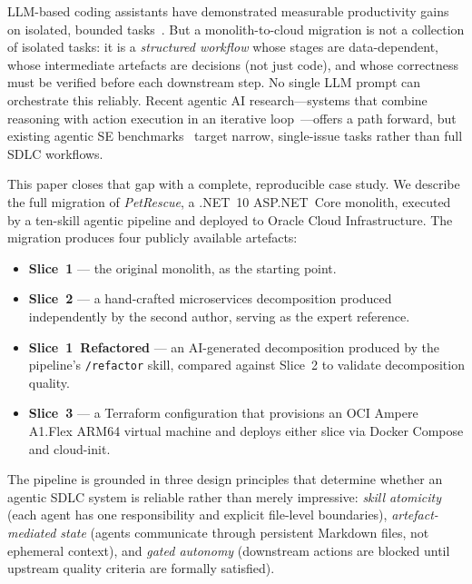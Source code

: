 \documentclass[10pt,journal,compsoc]{IEEEtran}
\begin{document}
LLM-based coding assistants have demonstrated measurable productivity
gains on isolated, bounded tasks~\cite{peng2023copilot,
vaithilingam2022expectation}.  But a monolith-to-cloud migration is
not a collection of isolated tasks: it is a \emph{structured workflow}
whose stages are data-dependent, whose intermediate artefacts are
decisions (not just code), and whose correctness must be verified
before each downstream step.  No single LLM prompt can orchestrate
this reliably.  Recent agentic AI research—systems that combine
reasoning with action execution in an iterative
loop~\cite{yao2023react,wang2024agents}—offers a path forward, but
existing agentic SE benchmarks~\cite{jimenez2024swebench} target
narrow, single-issue tasks rather than full SDLC workflows.

This paper closes that gap with a complete, reproducible case study.
We describe the full migration of \textit{PetRescue}, a .NET~10
ASP.NET~Core monolith, executed by a ten-skill agentic pipeline and
deployed to Oracle Cloud Infrastructure.  The migration produces four
publicly available artefacts:

\begin{itemize}
  \item \textbf{Slice~1} — the original monolith, as the starting point.
  \item \textbf{Slice~2} — a hand-crafted microservices decomposition
        produced independently by the second author, serving as the
        expert reference.
  \item \textbf{Slice~1~Refactored} — an AI-generated decomposition
        produced by the pipeline's \texttt{/refactor} skill, compared
        against Slice~2 to validate decomposition quality.
  \item \textbf{Slice~3} — a Terraform configuration that provisions
        an OCI Ampere A1.Flex ARM64 virtual machine and deploys either
        slice via Docker Compose and cloud-init.
\end{itemize}

The pipeline is grounded in three design principles that determine
whether an agentic SDLC system is reliable rather than merely
impressive: \emph{skill atomicity} (each agent has one responsibility
and explicit file-level boundaries), \emph{artefact-mediated state}
(agents communicate through persistent Markdown files, not ephemeral
context), and \emph{gated autonomy} (downstream actions are blocked
until upstream quality criteria are formally satisfied).
\end{document}
